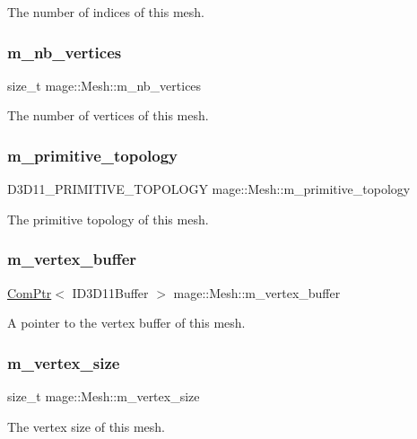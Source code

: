 The number of indices of this mesh. \hypertarget{classmage_1_1_mesh_a5a04aa73e98c75dd5b8929296c3af9bb}{}\label{classmage_1_1_mesh_a5a04aa73e98c75dd5b8929296c3af9bb} 
\subsubsection{\texorpdfstring{m\+\_\+nb\+\_\+vertices}{m\_nb\_vertices}}
{\footnotesize\ttfamily size\+\_\+t mage\+::\+Mesh\+::m\+\_\+nb\+\_\+vertices\hspace{0.3cm}{\ttfamily [private]}}

The number of vertices of this mesh. \hypertarget{classmage_1_1_mesh_a8757a0616fe72d0475ace99efc67350b}{}\label{classmage_1_1_mesh_a8757a0616fe72d0475ace99efc67350b} 
\subsubsection{\texorpdfstring{m\+\_\+primitive\+\_\+topology}{m\_primitive\_topology}}
{\footnotesize\ttfamily D3\+D11\+\_\+\+P\+R\+I\+M\+I\+T\+I\+V\+E\+\_\+\+T\+O\+P\+O\+L\+O\+GY mage\+::\+Mesh\+::m\+\_\+primitive\+\_\+topology\hspace{0.3cm}{\ttfamily [private]}}

The primitive topology of this mesh. \hypertarget{classmage_1_1_mesh_af5ae74887eb330201829477cf772ba6e}{}\label{classmage_1_1_mesh_af5ae74887eb330201829477cf772ba6e} 
\subsubsection{\texorpdfstring{m\+\_\+vertex\+\_\+buffer}{m\_vertex\_buffer}}
{\footnotesize\ttfamily \hyperlink{namespacemage_ae74f374780900893caa5555d1031fd79}{Com\+Ptr}$<$ I\+D3\+D11\+Buffer $>$ mage\+::\+Mesh\+::m\+\_\+vertex\+\_\+buffer\hspace{0.3cm}{\ttfamily [protected]}}

A pointer to the vertex buffer of this mesh. \hypertarget{classmage_1_1_mesh_a94a983af3aad7327aab525d6b40f90a7}{}\label{classmage_1_1_mesh_a94a983af3aad7327aab525d6b40f90a7} 
\subsubsection{\texorpdfstring{m\+\_\+vertex\+\_\+size}{m\_vertex\_size}}
{\footnotesize\ttfamily size\+\_\+t mage\+::\+Mesh\+::m\+\_\+vertex\+\_\+size\hspace{0.3cm}{\ttfamily [private]}}

The vertex size of this mesh. 